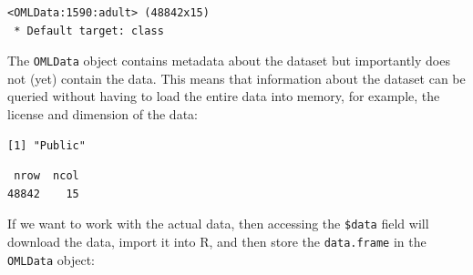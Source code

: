 \begin{Shaded}
\begin{Highlighting}[]
\OtherTok{=} \NormalTok{(} \NormalTok{)}
\end{Highlighting}
\end{Shaded}

\begin{verbatim}
<OMLData:1590:adult> (48842x15)
 * Default target: class
\end{verbatim}

The \texttt{OMLData} object contains metadata about the dataset but
importantly does not (yet) contain the data. This means that information
about the dataset can be queried without having to load the entire data
into memory, for example, the license and dimension of the data:

\begin{Shaded}
\begin{Highlighting}[]
\SpecialCharTok{$}
\end{Highlighting}
\end{Shaded}

\begin{verbatim}
[1] "Public"
\end{verbatim}

\begin{Shaded}
\begin{Highlighting}[]
\NormalTok{(}\SpecialCharTok{$}\SpecialCharTok{$}
\end{Highlighting}
\end{Shaded}

\begin{verbatim}
 nrow  ncol 
48842    15 
\end{verbatim}

If we want to work with the actual data, then accessing the
\texttt{\$data} field will download the data, import it into R, and then
store the \texttt{data.frame} in the \texttt{OMLData} object:

\begin{Shaded}
\begin{Highlighting}[]
\SpecialCharTok{$}\NormalTok{data[}\SpecialCharTok{:}\NormalTok{, }\SpecialCharTok{:}\NormalTok{]}
\end{Highlighting}
\end{Shaded}

